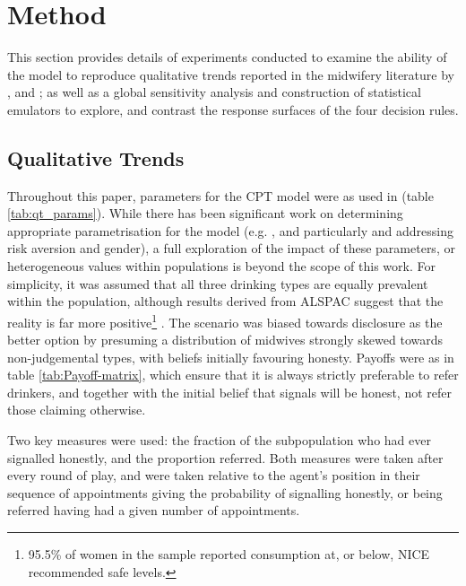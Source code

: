 \section{Method}
\label{sec:method}

This section provides details of experiments conducted to examine the ability of the model to reproduce qualitative trends reported in the midwifery literature by \citet{Alvik2006}, and \citet{Phillips2007}; as well as a global sensitivity analysis and construction of statistical emulators to explore, and contrast the response surfaces of the four decision rules.

\subsection{Qualitative Trends}
\label{sub:qt}

Throughout this paper, parameters for the \ac{CPT} model were as used in \cite{Tversky1992} (table \ref{tab:qt_params}). While there has been significant work on determining appropriate parametrisation for the model (e.g. \cite{Neilson2002,Nilsson2011,Glockner2012}, and particularly \citet{Byrnes1999} and \citet{Booij2009} addressing risk aversion and gender), a full exploration of the impact of these parameters, or heterogeneous values within populations is beyond the scope of this work. For simplicity, it was assumed that all three drinking types are equally prevalent within the population, although results derived from \acl{ALSPAC} suggest that the reality is far more positive\footnote{95.5\% of women in the sample reported consumption at, or below, \ac{NICE} recommended safe levels.} \citep{Humphriss2013}. The scenario was biased towards disclosure as the better option by presuming a distribution of midwives strongly skewed towards non-judgemental types, with beliefs initially favouring honesty. Payoffs were as in table \ref{tab:Payoff-matrix}, which ensure that it is always strictly preferable to refer drinkers, and together with the initial belief that signals will be honest, not refer those claiming otherwise.

Two key measures were used: the fraction of the subpopulation who had ever signalled honestly, and the proportion referred. Both measures were taken after every round of play, and were taken relative to the agent's position in their sequence of appointments giving the probability of signalling honestly, or being referred having had a given number of appointments.

